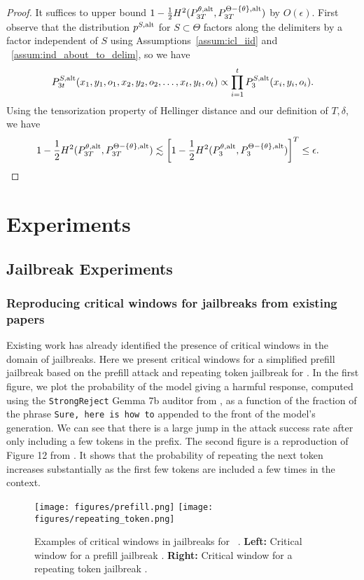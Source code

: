 \begin{proof}
It suffices to upper bound $1-\frac{1}{2}H^2(P^{\theta,\mathrm{alt}}_{3T},P^{\Theta-\{\theta\},\mathrm{alt}}_{3T})$ by $O(\epsilon)$. First observe that the distribution $p^{S,\mathrm{alt}}$ for $S \subset \Theta$ factors along the delimiters by a factor independent of $S$ using Assumptions~\ref{assum:icl_iid} and ~\ref{assum:ind_about_to_delim}, so we have
\[P^{S,\mathrm{alt}}_{3t}(x_1,y_1,o_1,x_2,y_2,o_2,\dots,x_t,y_t,o_t)\propto \prod_{i=1}^{t}P^{S,\mathrm{alt}}_3(x_i,y_i,o_i).\]
Using the tensorization property of Hellinger distance and our definition of $T,\delta$, we have
\begin{align*}
1-\frac{1}{2}H^2(P^{\theta,\mathrm{alt}}_{3T},P^{\Theta-\{\theta\},\mathrm{alt}}_{3T}) &\lesssim\left[1-\frac{1}{2}H^2(P^{\theta,\mathrm{alt}}_{3},P^{\Theta-\{\theta\},\mathrm{alt}}_{3})\right]^T \leq \epsilon. \qedhere
\end{align*}
\end{proof}

\section{Experiments}
\subsection{Jailbreak Experiments}
\subsubsection{Reproducing critical windows for jailbreaks from existing papers}

Existing work has already identified the presence of critical windows in the domain of jailbreaks. Here we present critical windows for a simplified prefill jailbreak based on the prefill attack \citep{prefillingattack} and repeating token jailbreak \citep{nasr2023scalableextractiontrainingdata} for \llamainstruct. In the first figure, we plot the probability of the model giving a harmful response, computed using the \texttt{StrongReject} Gemma 7b auditor from \citep{souly2024strongrejectjailbreaks}, as a function of the fraction of the phrase \texttt{Sure, here is how to} appended to the front of the model's generation. We can see that there is a large jump in the attack success rate after only including a few tokens in the prefix. The second figure is a reproduction of Figure 12 from \cite{nasr2023scalableextractiontrainingdata}. It shows that the probability of repeating the next token increases substantially as the first few tokens are included a few times in the context. 
\begin{figure}[H] 
    \centering
    \texttt{[image: figures/prefill.png]}
    \texttt{[image: figures/repeating\_token.png]}
    \caption{Examples of critical windows in jailbreaks for ~\llamainstruct. \textbf{Left:} Critical window for a prefill jailbreak \citep{prefillingattack}. \textbf{Right:} Critical window for a repeating token jailbreak \citep{nasr2023scalableextractiontrainingdata}. }
    \label{fig:app:jailbreak_cw}
\end{figure}


